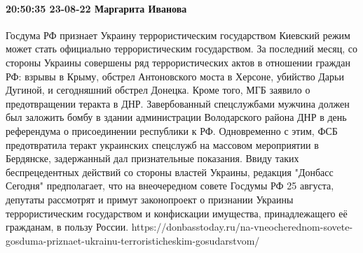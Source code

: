  
 
 
 
 

\paragraph{20:50:35 23-08-22 Маргарита Иванова}

Госдума РФ признает Украину террористическим государством
Киевский режим может стать официально террористическим государством. За последний месяц, со стороны Украины совершены ряд террористических актов в отношении граждан РФ: взрывы в Крыму, обстрел Антоновского моста в Херсоне, убийство Дарьи Дугиной, и сегодняшний обстрел Донецка.
Кроме того, МГБ заявило о предотвращении теракта в ДНР. Завербованный спецслужбами мужчина должен был заложить бомбу в здании администрации Володарского района ДНР в день референдума о присоединении республики к РФ. Одновременно с этим, ФСБ предотвратила теракт украинских спецслужб на массовом мероприятии в Бердянске, задержанный дал признательные показания.
Ввиду таких беспрецедентных действий со стороны властей Украины, редакция "Донбасс Сегодня" предполагает, что на внеочередном совете Госдумы РФ 25 августа, депутаты рассмотрят и примут законопроект о признании Украины террористическим государством и конфискации имущества, принадлежащего её гражданам, в пользу России.
https://donbasstoday.ru/na-vneocherednom-sovete-gosduma-priznaet-ukrainu-terroristicheskim-gosudarstvom/
